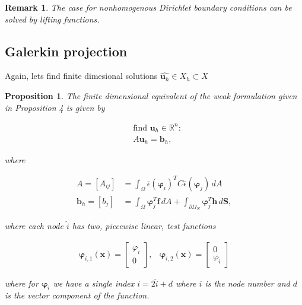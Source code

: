 \documentclass[5pt,a4paper,english]{elsarticle}%
\newtheorem{proposition}[theorem]{Proposition}
\newtheorem*{remark}{Remark}
\begin{document}
\begin{remark}
    The case for nonhomogenous Dirichlet boundary conditions can be solved by lifting functions.
\end{remark}
\subsection{Galerkin projection}
Again, lets find finite dimesional solutions $\hat{\bm u_h} \in X_h \subset X$

\begin{proposition}
    The finite dimensional equivalent of the weak formulation given in Proposition 4 is given by


        \begin{align}
        &\text{find } \bm u_h \in \mathbb{R}^n : \\
        & A \bm u_h = \bm b_h,
        \end{align}


    where 


        \begin{align}
        A = [A_{ij}] &= \int_\Omega \overline\epsilon (\bm \varphi_i)^T C \overline \epsilon (\bm \varphi_j) \, dA \\
        \bm b_h = [b_j] &= \int_\Omega \bm \varphi_j^T \bm f \, dA + \int_{\partial \Omega_N} \bm \varphi_j^T \bm h \, d\bm S,
        \end{align}


    where each node $\hat i$ has two, piecewise linear, test functions
    
 
        \begin{align}
        \bm \varphi_{\hat i,1} (\bm x) = 
         \begin{bmatrix}
            \varphi_{\hat i}  \\
            0 
        \end{bmatrix},
        &
        \bm \varphi_{\hat i,2} (\bm x) = 
        \begin{bmatrix}
            0  \\
            \varphi_{\hat i} 
        \end{bmatrix} 
    \end{align}

    where for $\bm \varphi_i$ we have a single index $i = 2\hat i + d$ where $i$ is the node number and $d$ is the vector component of the function.
\end{proposition}
\end{document}
